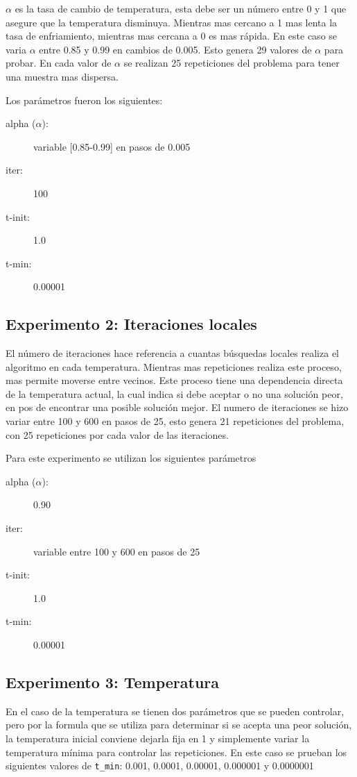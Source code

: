 \documentclass[letterpaper,10pt]{article}
\begin{document}
$\alpha$ es la tasa de cambio de temperatura, esta debe ser un número entre 0 y 1 que asegure que la temperatura disminuya. Mientras mas cercano a 1 mas lenta la tasa de enfriamiento, mientras mas cercana a 0 es mas rápida. En este caso se varia $\alpha$ entre 0.85 y 0.99 en cambios de 0.005. Esto genera 29 valores de $\alpha$ para probar. En cada valor de $\alpha$ se realizan 25 repeticiones del problema para tener una muestra mas dispersa.

Los parámetros fueron los siguientes:

\begin{description}
  \item[alpha ($\alpha$):] variable [0.85-0.99] en pasos de 0.005
  \item[iter:] 100
  \item[t-init:] 1.0
  \item[t-min:] 0.00001
\end{description}

\subsection{Experimento 2: Iteraciones locales}

El número de iteraciones hace referencia a cuantas búsquedas locales realiza el algoritmo en cada temperatura.
Mientras mas repeticiones realiza este proceso, mas permite moverse entre vecinos. Este proceso tiene una dependencia directa de la temperatura actual, la cual indica si debe aceptar o no una solución peor, en pos de encontrar una posible solución mejor. El numero de iteraciones se hizo variar entre 100 y 600 en pasos de 25, esto genera 21 repeticiones del problema, con 25 repeticiones por cada valor de las iteraciones.

Para este experimento se utilizan los siguientes parámetros
\begin{description}
  \item[alpha ($\alpha$):] 0.90
  \item[iter:] variable entre 100 y 600 en pasos de 25
  \item[t-init:] 1.0
  \item[t-min:] 0.00001
\end{description}

\subsection{Experimento 3: Temperatura}

En el caso de la temperatura se tienen dos parámetros que se pueden controlar, pero por la  formula que se utiliza para determinar si se acepta una peor solución, la temperatura inicial conviene dejarla fija en 1 y simplemente variar la temperatura mínima para controlar las repeticiones. En este caso se prueban los siguientes valores de \texttt{t\_min}: 0.001, 0.0001, 0.00001, 0.000001 y 0.0000001
\end{document}
